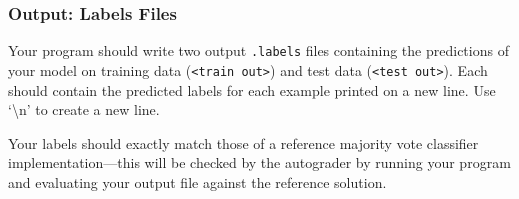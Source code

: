 \documentclass[11pt,addpoints,answers]{exam}
\begin{document}









\subsubsection{Output: Labels Files}
\label{sec:labels}

Your program should write two output \lstinline{.labels} files containing the predictions of your model on training data (\lstinline{<train out>}) and test data (\lstinline{<test out>}). Each should contain the predicted labels for each example printed on a new line. Use `\textbackslash n' to create a new line.

Your labels should exactly match those of a reference majority vote classifier implementation---this will be checked by the autograder by running your program and evaluating your output file against the reference solution.
\end{document}
